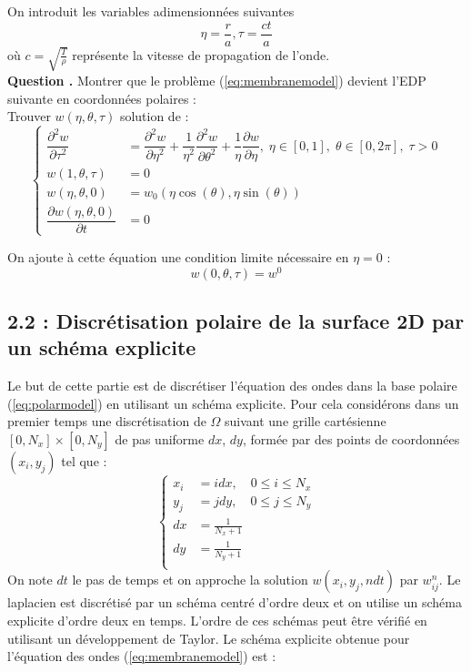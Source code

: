 \documentclass[a4,12pt]{article}
\newcounter{Nbquestion}
\newcommand*\question{%
\stepcounter{Nbquestion}%
\textbf{Question \theNbquestion. }}
\begin{document}
	On introduit les variables adimensionnées suivantes 
	\[
	  \eta=\dfrac{r}{a},\tau=\dfrac{ct}{a}
	\]
	où $c=\sqrt{\frac{T}{\rho}}$ représente la vitesse de propagation  de l'onde.\\ 


	\question Montrer que le problème (\ref{eq:membranemodel}) devient l'EDP suivante en coordonnées polaires :\\

	Trouver $w(\eta,\theta,\tau)$ solution de :
	\begin{equation}
	  \left\{
	    \begin{array}{rl}
	      \dfrac{\partial^2 w}{\partial \tau^2} & =   \dfrac{\partial^2 w}{\partial \eta^2}+\dfrac{1}
	      {\eta^2}\dfrac{\partial^2 w}{\partial \theta^2}+\dfrac{1}{\eta}\dfrac{\partial w}{\partial \eta},\;\eta\in[0,1],\;		\theta\in[0,2\pi],\;\tau>0\\
	      w(1,\theta,\tau)& = 0  \\
	      w(\eta,\theta,0)& = w_0(\eta \cos(\theta),\eta \sin (\theta)) \\
	      \dfrac{\partial w(\eta,\theta,0)}{\partial t} & = 0
	    \end{array}
	    \right.
	    \label{eq:polarmodel}
	  \end{equation}

	  On ajoute à cette équation une condition limite nécessaire  en $\eta=0$ :
	  \[
	    w(0,\theta,\tau)=w^0
	  \]


	  \subsection*{2.2 : Discrétisation polaire de la surface 2D par un schéma explicite }
	  Le but de cette partie est de discrétiser l'équation des ondes dans la base polaire (\ref{eq:polarmodel}) en utilisant un schéma explicite. Pour cela considérons dans un premier temps une discrétisation de $\Omega $ suivant une grille cartésienne $[0,N_x]\times [0,N_y]$ de pas uniforme $dx$, $dy$, formée par des points de coordonnées $(x_i,y_j)$ tel que :
	  \begin{equation*}{}
	    \left\{
	      \begin{array}{rl}
		x_i &=i dx,\quad 0\leq i \leq N_x \\
		y_j &=j dy,\quad  0\leq j \leq N_y \\
		dx & =\frac{1}{N_x+1}\\
		dy &=\frac{1}{N_y+1}\\
	      \end{array}
	      \right.
	    \end{equation*}
	    On note $dt$ le pas de temps et on approche la solution $w(x_i,y_j,ndt)$ par $w_{ij}^{n}$. Le laplacien est discrétisé  par un schéma centré d'ordre deux  et on utilise un schéma explicite d'ordre deux en temps. L'ordre de ces schémas peut être vérifié en utilisant un développement de Taylor. Le schéma explicite obtenue pour l'équation des ondes (\ref{eq:membranemodel}) est :
\end{document}
